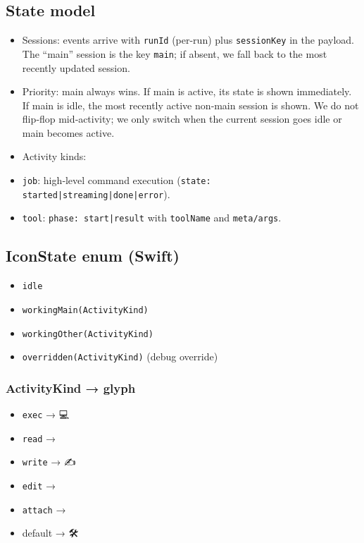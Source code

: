 \subsection{State model}


\begin{itemize}
  \item Sessions: events arrive with \texttt{runId} (per-run) plus \texttt{sessionKey} in the payload. The “main” session is the key \texttt{main}; if absent, we fall back to the most recently updated session.
  \item Priority: main always wins. If main is active, its state is shown immediately. If main is idle, the most recently active non‑main session is shown. We do not flip‑flop mid‑activity; we only switch when the current session goes idle or main becomes active.
  \item Activity kinds:
  \item \texttt{job}: high‑level command execution (\texttt{state: started|streaming|done|error}).
  \item \texttt{tool}: \texttt{phase: start|result} with \texttt{toolName} and \texttt{meta/args}.
\end{itemize}


\subsection{IconState enum (Swift)}


\begin{itemize}
  \item \texttt{idle}
  \item \texttt{workingMain(ActivityKind)}
  \item \texttt{workingOther(ActivityKind)}
  \item \texttt{overridden(ActivityKind)} (debug override)
\end{itemize}


\subsubsection{ActivityKind → glyph}


\begin{itemize}
  \item \texttt{exec} → 💻
  \item \texttt{read} → 📄
  \item \texttt{write} → ✍️
  \item \texttt{edit} → 📝
  \item \texttt{attach} → 📎
  \item default → 🛠️
\end{itemize}


